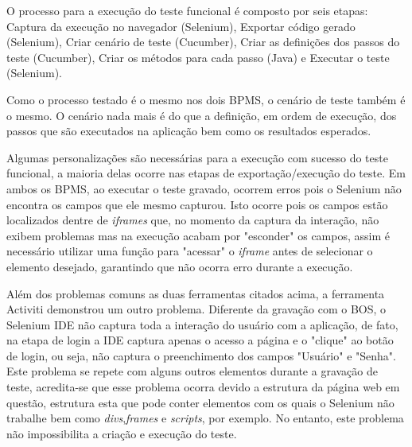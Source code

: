 \documentclass[12pt]{article}
\begin{document}
O processo para a execução do teste funcional é composto por seis etapas: Captura da execução no navegador (Selenium), Exportar código gerado (Selenium), Criar cenário de teste (Cucumber), Criar as definições dos passos do teste (Cucumber), Criar os métodos para cada passo (Java) e Executar o teste (Selenium).

Como o processo testado é o mesmo nos dois BPMS, o cenário de teste também é o mesmo. O cenário nada mais é do que a definição, em ordem de execução, dos passos que são executados na aplicação bem como  os resultados esperados.

Algumas personalizações são necessárias para a execução com sucesso do teste funcional, a maioria delas ocorre nas etapas de exportação/execução do teste. Em ambos os BPMS, ao executar o teste gravado, ocorrem erros pois o Selenium não encontra os campos que ele mesmo capturou. Isto ocorre pois os campos estão localizados dentre de \emph{iframes} que, no momento da captura da interação, não exibem problemas mas na execução acabam por "esconder" os campos, assim é necessário utilizar uma função para "acessar" o \emph{iframe} antes de selecionar o elemento desejado, garantindo que não ocorra erro durante a execução.




Além dos problemas comuns as duas ferramentas citados acima, a ferramenta Activiti demonstrou um outro problema. Diferente da gravação com o BOS, o Selenium IDE não captura toda a interação do usuário com a aplicação, de fato, na etapa de login a IDE captura apenas o acesso a página e o "clique" ao botão de login, ou seja, não captura o preenchimento dos campos "Usuário" e "Senha". Este problema se repete com alguns outros elementos durante a gravação de teste, acredita-se que esse problema ocorra devido a estrutura da página web em questão, estrutura esta que pode conter elementos com os quais o Selenium não trabalhe bem como \emph{divs},\emph{frames} e \emph{scripts}, por exemplo. No entanto, este problema não impossibilita a criação e execução do teste.
\end{document}
